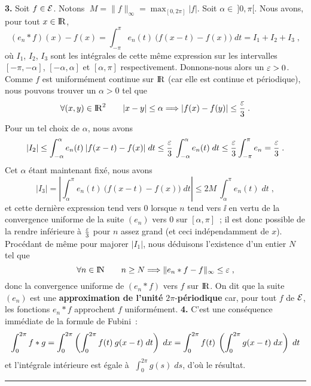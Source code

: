 \documentclass{article}
\begin{document}
\msk
{\bf 3.} Soit $f\in {\cal E}$. Notons $\;M=\|f\|_{\infty}=\max_{[0,2\pi]}|f|$.\ssk\sect
Soit $\alpha\in\>]0,\pi[$. Nous avons, pour tout $x\in{\rm I\kern-0.6mm R}$,\vv
$$(e_n*f)(x)-f(x)=\int_{-\pi}^{\pi}e_n(t)\>\big(f(x-t)-f(x)\big)\;dt
  =I_1+I_2+I_3\;,$$
o\`u $I_1$, $I_2$, $I_3$ sont les int\'egrales de cette m\^eme expression sur les
intervalles $[-\pi,-\alpha]$, $[-\alpha,\alpha]$ et $[\alpha,\pi]$
respectivement.\ssk\sect
Donnons-nous alors un $\varepsilon>0$. Comme $f$ est uniform\'ement continue sur
${\rm I\kern-0.6mm R}$ (car elle est continue et p\'eriodique), nous pouvons trouver un
$\alpha>0$ tel que\vv
$$\forall(x,y)\in{\rm I\kern-0.6mm R}^2\qquad|x-y|\le\alpha\Longrightarrow|f(x)-f(y)|\le{\varepsilon\over3}\;.$$
Pour un tel choix de $\alpha$, nous avons\vv
$$|I_2|\le\int_{-\alpha}^{\alpha}e_n(t)\>|f(x-t)-f(x)|\;dt\le{\varepsilon\over3}\>
  \int_{-\alpha}^{\alpha}e_n(t)\;dt\le{\varepsilon\over3}\int_{-\pi}^{\pi}e_n=
  {\varepsilon\over3}\;.$$
Cet $\alpha$ \'etant maintenant fix\'e, nous avons\vv
$$|I_3|=\left|\int_{\alpha}^{\pi}e_n(t)\>\big(f(x-t)-f(x)\big)\;dt\right|\le
  2M\>\int_{\alpha}^{\pi}e_n(t)\;dt\;,$$
et cette derni\`ere expression tend vers 0 lorsque $n$ tend vers $\ii$ en vertu
de la convergence uniforme de la suite $(e_n)$ vers 0 sur $[\alpha,\pi]$~;
il est donc possible de la rendre inf\'erieure \`a ${\varepsilon\over3}$ pour $n$ assez
grand (et ceci ind\'ependamment de $x$). Proc\'edant de m\^eme pour majorer
$|I_1|$, nous d\'eduisons l'existence d'un entier $N$ tel que\vv
$$\forall n\in{\rm I\kern-0.5mm N}\qquad n\ge N\Longrightarrow\|e_n*f-f\|_{\infty}\le \varepsilon\;,$$
donc la convergence uniforme de $(e_n*f)$ vers $f$ sur ${\rm I\kern-0.6mm R}$.\pn
On dit que la suite $(e_n)$ est une {\bf approximation de l'unit\'e}
$2\pi$-{\bf p\'eriodique} car, pour
tout $f$ de ${\cal E}$, les fonctions $e_n*f$ approchent $f$ uniform\'ement. 
\msk
{\bf 4.} C'est une cons\'equence imm\'ediate de la formule de Fubini~:\vv
$$\int_0^{2\pi}f*g = \int_0^{2\pi}\left(\int_0^{2\pi}f(t)\>g(x-t)\;
                                    dt\right)\;dx=\int_0^{2\pi}f(t)\>\left(
                                    \int_0^{2\pi}g(x-t)\;dx\right)\;dt$$
et l'int\'egrale int\'erieure est \'egale \`a $\;\int_0^{2\pi}g(s)\;ds$,
d'o\`u le r\'esultat.

\bsk
\hrule
\bsk
\end{document}
